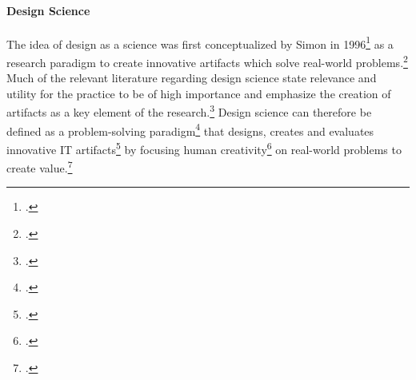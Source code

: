 
\paragraph{Design Science}
The idea of design as a science was first conceptualized by Simon in 1996\footcite[Cf.][]{Simonsciencesartificial1996} as a research paradigm to create innovative artifacts which solve real-world problems.\footcite[Cf.][p.9]{HevnerDesignResearchInformation2010}
Much of the relevant literature regarding design science state relevance and utility for the practice to be of high importance and emphasize the creation of artifacts as a key element of the research.\footcites[Cf.][p.253, 254]{MarchDesignnaturalscience1995}[cf.][p.9, 11]{HevnerDesignResearchInformation2010}[cf.][p.77]{HevnerDesignScienceResearch2004}[cf.][p.1]{PapalambrosDesignScienceWhy2015}[cf.][p.330,342]{GregorPositioningpresentingdesign2013} Design science can therefore be defined as a problem-solving paradigm\footcite[Cf.][p.77]{HevnerDesignScienceResearch2004} that designs, creates and evaluates innovative \ac{IT} artifacts\footcite[Cf.][p.90]{HevnerDesignScienceResearch2004} by focusing human creativity\footcite[Cf.][p.13]{HevnerDesignResearchInformation2010} on real-world problems to create value.\footcite[Cf.][p.1]{PapalambrosDesignScienceWhy2015} %

